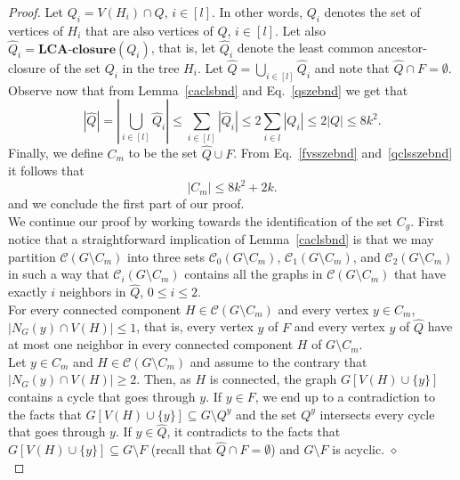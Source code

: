 \documentclass[a4paper,11pt]{article}
\newcommand{\cc}{{\mathcal{C}}}
\newcommand{\lcac}{{\textbf{LCA-closure}}}
\begin{document}
\begin{proof}
\noindent Let $Q_{i}=V(H_{i})\cap Q$, $i\in [l]$. In other words, $Q_{i}$ denotes the set of vertices of $H_{i}$ that are also vertices of $Q$, $i\in [l]$. 
Let also $\widehat{Q}_{i}=\lcac(Q_{i})$, that is, let $\widehat{Q}_{i}$ denote the least common ancestor-closure of the set $Q_{i}$ in the tree $H_{i}$. 
Let $\displaystyle\widehat{Q}=\bigcup_{i\in [l]}\widehat{Q}_{i}$ and note that $\widehat{Q}\cap F=\emptyset$. Observe now that from 
Lemma~\ref{caclsbnd} and Eq.~\eqref{qszebnd} we get that
\begin{equation}\label{qclsszebnd}
\displaystyle \left|\widehat{Q}\right|=\left|\bigcup_{i\in [l]}\widehat{Q}_{i}\right|\leq \sum_{i\in [l]}\left|\widehat{Q}_{i}\right|\leq 
2\sum_{i\in l}\left|Q_{i}\right|\leq 2\left|Q\right|\leq 8k^{2}.
\end{equation}
Finally, we define $C_{m}$ to be the set $\widehat{Q}\cup F$.
From Eq.~\eqref{fvsszebnd} and~\eqref{qclsszebnd} it follows that 
\begin{equation}
|C_{m}|\leq 8k^{2}+2k.
\end{equation}
and we conclude the first part of our proof.\\

We continue our proof by working towards the identification of the set $C_{g}$. 
First notice that a straightforward implication of Lemma~\ref{caclsbnd} is that we may partition $\cc(G\setminus C_{m})$
into three sets $\cc_{0}(G\setminus C_{m})$, $\cc_{1}(G\setminus C_{m})$, and $\cc_{2}(G\setminus C_{m})$ in such a way that $\cc_{i}(G\setminus C_{m})$ 
contains all the graphs in $\cc(G\setminus C_{m})$ that have exactly $i$ neighbors in $\widehat{Q}$, $0\leq i \leq 2$.\\

 For every connected component $H\in \cc(G\setminus C_{m})$ and every vertex $y\in C_{m}$, $|N_{G}(y)\cap V(H)|\leq 1$, that is, 
every vertex $y$ of $F$ and every vertex $y$ of $\widehat{Q}$ have at most one neighbor in every connected component $H$ of $G\setminus C_{m}$.\\

 Let $y\in C_{m}$ and $H\in \cc(G\setminus C_{m})$ and assume to the contrary that $|N_{G}(y)\cap V(H)|\geq 2$. 
Then, as $H$ is connected, the graph $G[V(H)\cup\{y\}]$ contains a cycle that goes through $y$.
 If $y\in F$, we end up to a contradiction to the facts that $G[V(H)\cup \{y\}]\subseteq G\setminus Q^{y}$
 and the set $Q^{y}$ intersects every cycle that goes through $y$. If $y\in \widehat{Q}$, it contradicts to the facts that 
 $G[V(H)\cup\{y\}]\subseteq G\setminus F$ (recall that $\widehat{Q}\cap F=\emptyset$) and $G\setminus F$ is acyclic. \hfill $\diamond$\\
 


\end{proof}
\end{document}
